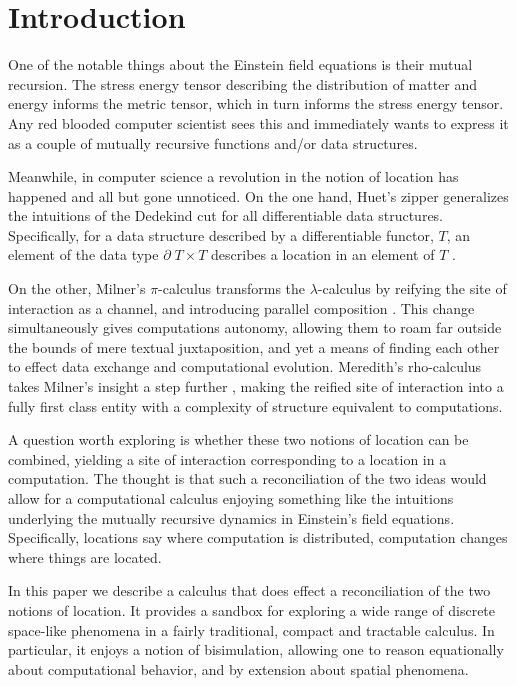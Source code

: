 \section{Introduction}\label{sec:introduction} %

One of the notable things about the Einstein field equations
\cite{Misner1973} is their mutual recursion. The stress energy tensor
describing the distribution of matter and energy informs the metric
tensor, which in turn informs the stress energy tensor. Any red
blooded computer scientist sees this and immediately wants to express
it as a couple of mutually recursive functions and/or data structures.

Meanwhile, in computer science a revolution in the notion of location
has happened and all but gone unnoticed. On the one hand, Huet's
zipper \cite{DBLP:journals/jfp/Huet97} generalizes the intuitions of
the Dedekind cut for all differentiable data structures. Specifically,
for a data structure described by a differentiable functor, $T$, an
element of the data type $\partial \; T \times T$ describes a location
in an element of $T$ \cite{DBLP:conf/popl/McBride08}.

On the other, Milner's $\pi$-calculus transforms the
$\lambda$-calculus by reifying the site of interaction as a channel,
and introducing parallel composition \cite{milner91polyadicpi}. This
change simultaneously gives computations autonomy, allowing them to
roam far outside the bounds of mere textual juxtaposition, and yet a
means of finding each other to effect data exchange and computational
evolution. Meredith's rho-calculus takes Milner's insight a step
further \cite{DBLP:journals/entcs/MeredithR05}, making the reified
site of interaction into a fully first class entity with a complexity
of structure equivalent to computations.

A question worth exploring is whether these two notions of location
can be combined, yielding a site of interaction corresponding to a
location in a computation. The thought is that such a reconciliation
of the two ideas would allow for a computational calculus enjoying
something like the intuitions underlying the mutually recursive
dynamics in Einstein's field equations. Specifically, locations say
where computation is distributed, computation changes where things are
located.

In this paper we describe a calculus that does effect a reconciliation
of the two notions of location. It provides a sandbox for exploring a
wide range of discrete space-like phenomena in a fairly traditional,
compact and tractable calculus. In particular, it enjoys a notion of
bisimulation, allowing one to reason equationally about computational
behavior, and by extension about spatial phenomena.

